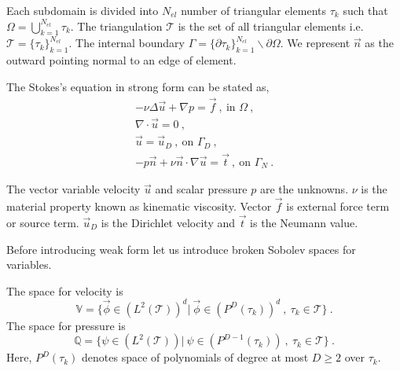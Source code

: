 \documentclass[graybox]{svmult}
\begin{document}
Each subdomain is divided into $N_{el}$ number of triangular elements $\tau_k$ such that $\Omega = \bigcup\limits_{k=1}^{N_{el}} \tau_k$. The triangulation $\mathcal{T}$ is the set of all triangular elements i.e. $\mathcal{T} = \lbrace \tau_k \rbrace_{k=1}^{N_{el}}$. The internal boundary $\Gamma = \lbrace \partial \tau_k \rbrace_{k=1}^{N_{el}} \backslash \partial \Omega$. We represent $\overrightarrow{n}$ as the outward pointing normal to an edge of element.

The Stokes's equation in strong form can be stated as,
\begin{gather}
-\nu \Delta \overrightarrow{u} + \nabla p = \overrightarrow{f} \ , \ \text{in } \Omega \ , \\
\nabla \cdot \overrightarrow{u} = 0 \ , \\
\overrightarrow{u} = \overrightarrow{u}_D \ , \ \text{on } \Gamma_D \ , \\
-p \overrightarrow{n} + \nu \overrightarrow{n} \cdot \nabla \overrightarrow{u} = \overrightarrow{t} \ , \ \text{on } \Gamma_N \ .
\end{gather}

The vector variable velocity $\overrightarrow{u}$ and scalar pressure $p$ are the unknowns. $\nu$ is the material property known as kinematic viscosity. Vector $\overrightarrow{f}$ is external force term or source term. $\overrightarrow{u}_D$ is the Dirichlet velocity and $\overrightarrow{t}$ is the Neumann value.

Before introducing weak form let us introduce broken Sobolev spaces for variables.

The space for velocity is 
\begin{equation} \label{velocity_test}
\mathbb{V} = \lbrace \overrightarrow{\phi} \in (L^2(\mathcal{T}))^d | \ \overrightarrow{\phi} \in (P^D(\tau_k))^d \ , \ \tau_k \in \mathcal{T} \rbrace \ .
\end{equation}
The space for pressure is 
\begin{equation} \label{pressure_test}
\mathbb{Q} = \lbrace \psi \in (L^2(\mathcal{T})) | \ \psi \in (P^{D-1}(\tau_k)) \ , \ \tau_k \in \mathcal{T} \rbrace \ .
\end{equation}
Here, $P^D(\tau_k)$ denotes space of polynomials of degree at most $D \geq 2$ over $\tau_k$.
\end{document}
